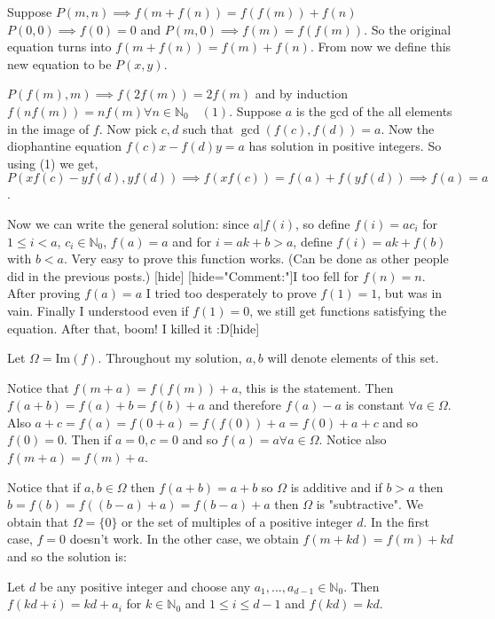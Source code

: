 \begin{solution}Suppose $P(m,n)\implies f(m+f(n))=f(f(m))+f(n)$
$P(0,0)\implies f(0)=0$ and $P(m,0)\implies f(m)=f(f(m))$. So the original equation turns into $f(m+f(n))=f(m)+f(n)$. From now we define this new equation to be $P(x,y)$. 

$P(f(m),m)\implies f(2f(m))=2f(m)$ and by induction $f(nf(m))=nf(m)\forall n\in \mathbb N_0\quad (1)$. Suppose $a$ is the gcd of the all elements in the image of $f$. Now pick $c,d$ such that $\gcd (f(c),f(d))=a$. Now the diophantine equation $f(c)x-f(d)y=a$ has solution in positive integers. So using (1) we get, $P(xf(c)-yf(d),yf(d))\implies f(xf(c))=f(a)+f(yf(d))\implies f(a)=a$. 

Now we can write the general solution: since $a|f(i)$, so define $f(i)=ac_i$ for $1\leq i<a$, $c_i\in \mathbb N_0$, $f(a)=a$ and for $i=ak+b>a$, define $f(i)=ak+f(b)$ with $b<a$. Very easy to prove this function works. (Can be done as other people did in the previous posts.) [\/hide]
[hide="Comment:"]I too fell for $f(n)=n$. After proving $f(a)=a$ I tried too desperately to prove $f(1)=1$, but was in vain. Finally I understood even if $f(1)=0$, we still get functions satisfying the equation. After that, boom! I killed it :D[\/hide]
\end{solution}



\begin{solution}
	Let $\Omega = \text{Im} (f) $. Throughout my solution, $a,b$ will denote elements of this set.

Notice that $f(m+a)=f(f(m))+a$, this is the statement. Then $f(a+b)=f(a)+b=f(b)+a$ and therefore $f(a)-a$ is constant $\forall a \in \Omega$. Also $a+c=f(a)=f(0+a)=f(f(0))+a=f(0)+a+c$ and so $f(0)=0$. Then if $a=0, c=0$ and so $f(a)=a \forall a \in \Omega$. Notice also $f(m+a)=f(m)+a$.

Notice that if $a,b \in \Omega$ then $f(a+b)=a+b$ so $\Omega$ is additive and if $b > a$ then $b=f(b)=f((b-a)+a)=f(b-a)+a$ then $\Omega$ is "subtractive". We obtain that $\Omega=\{0\}$ or the set of multiples of a positive integer $d$. In the first case, $f=0$ doesn't work. In the other case, we obtain $f(m+kd)=f(m)+kd$ and so the solution is:

Let $d$ be any positive integer and choose any $a_1,...,a_{d-1} \in \mathbb{N}_0$. Then $f(kd+i) = kd+a_i$ for $k \in \mathbb{N}_0$ and $1 \le i \le d-1$ and $f(kd)=kd$.
\end{solution}



